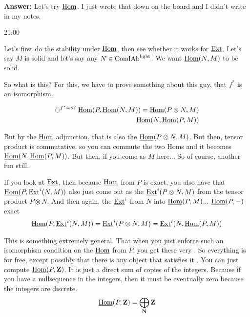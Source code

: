 \textbf{Answer:} Let's try $\operatorname{\underline{Hom}}$. I just wrote that down on the board and I didn't write in my notes.

\begin{unfinished}{21:00}

Let's first do the stability under $\operatorname{\underline{Hom}}$, then see whether it works for $\operatorname{\underline{Ext}}$. 
Let's say $M$ is solid and let's say any $N \in \mathrm{Cond}\mathrm{Ab}^{\mathrm{light}}$. We want $\operatorname{\underline{Hom}}(N, M)$ to be solid.

So what is this? For this, we have to prove something about this guy, that $f^\ast$ is an isomorphism.

\begin{align*}
\circlearrowright^{f^\ast iso?} \operatorname{\underline{Hom}}(P, \operatorname{\underline{Hom}}(N,M)) = \operatorname{\underline{Hom}}(P \otimes N, M) \\
\operatorname{\underline{Hom}}(N, \operatorname{\underline{Hom}}(P,M))
\end{align*}

But by the $\operatorname{\underline{Hom}}$ adjunction, that is also the $\operatorname{\underline{Hom}}(P \otimes N, M)$. But then, tensor product is commutative, so you can commute the two Homs  and it becomes $\operatorname{\underline{Hom}}(N, \operatorname{\underline{Hom}}(P,M))$. 
But then, if you come as $M$ here... So of course, another fun still.

If you look at $\operatorname{\underline{Ext}}$, then because $\operatorname{\underline{Hom}}$ from $P$ is exact, you also have that $\operatorname{\underline{Hom}}(P, \operatorname{Ext}^i(N, M))$ also just come out as the $\operatorname{\underline{Ext}}^i(P \otimes N, M)$ from the tensor product $P \otimes N$. 
And then again, the $\operatorname{\underline{Ext}}^i$ from $N$ into $\operatorname{\underline{Hom}}(P,M)$...
$\operatorname{\underline{Hom}}(P,-)$ exact
\begin{align*}
\operatorname{\underline{Hom}}(P,\operatorname{\underline{Ext}}^i(N,M)) = \operatorname{\underline{Ext}}^i(P \otimes N,M) = \operatorname{\underline{Ext}}^i(N,\operatorname{\underline{Hom}}(P,M))
\end{align*}

This is something extremely general. That when you just enforce such an isomorphism condition on the $\operatorname{\underline{Hom}}$ from $P$, you get these very .
So everything is for free, except possibly that there is any object that satisfies it . 
You can just compute $\operatorname{\underline{Hom}}(P,\mathbf Z)$. It is just a direct sum of copies of the integers. 
Because if you have a nullsequence in the integers, then it must be eventually zero because the integers are discrete.
\begin{align*}
\IntHom(P,\Z) = \bigoplus_\N \Z %
\end{align*}



\end{unfinished}

